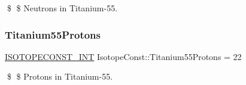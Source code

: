 \$ \$ Neutrons in Titanium-\/55. \mbox{\label{group___isotope_const-_titanium-_ti55_ga27735e193f15afc45c3b900815fc23e8}} 
\subsubsection{\texorpdfstring{Titanium55\+Protons}{Titanium55Protons}}
{\footnotesize\ttfamily \mbox{\hyperlink{group___isotope_const-_macros_ga5f18360b3e99483a35c32d789e62621c}{I\+S\+O\+T\+O\+P\+E\+C\+O\+N\+S\+T\+\_\+\+I\+NT}} Isotope\+Const\+::\+Titanium55\+Protons = 22}

\$ \$ Protons in Titanium-\/55. 
